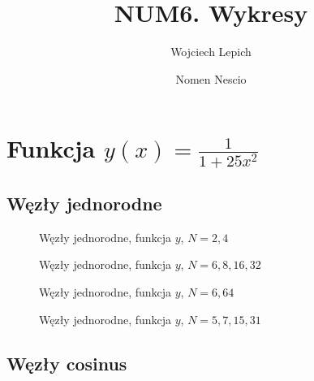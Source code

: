 \documentclass[a4paper,11pt]{article}
\author{Wojciech Lepich \and Nomen Nescio}
\title{NUM6. Wykresy}
\begin{document}
\renewcommand*\listfigurename{Spis wykresów}
\maketitle
\listoffigures

\section{Funkcja \(y(x) = \frac{1}{1+25x^2}\)}
\subsection{Węzły jednorodne}

\begin{figure}[H]
    \begin{center}
                
    \end{center}
    \caption{Węzły jednorodne, funkcja \(y\), \(N=2, 4\)}
\end{figure}

\begin{figure}[H]
    \begin{center}
                
    \end{center}
    \caption{Węzły jednorodne, funkcja \(y\), \(N=6, 8, 16, 32\)}
\end{figure}

\begin{figure}[H]
    \begin{center}
                
    \end{center}
    \caption{Węzły jednorodne, funkcja \(y\), \(N=6, 64\)}
\end{figure}

\begin{figure}[H]
    \begin{center}
                
    \end{center}
    \caption{Węzły jednorodne, funkcja \(y\), \(N=5,7,15,31\)}
\end{figure}

\subsection{Węzły cosinus}
\end{document}
